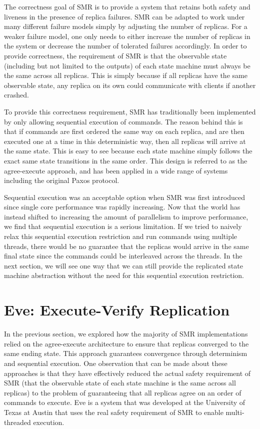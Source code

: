 \documentclass[11pt, oneside]{report}
\begin{document}
The correctness goal of SMR is to provide a system that retains both safety and liveness in the presence of replica failures. SMR can be adapted to work under many different failure models simply by adjusting the number of replicas. For a weaker failure model, one only needs to either increase the number of replicas in the system or decrease the number of tolerated failures accordingly. In order to provide correctness, the requirement of SMR is that the observable state (including but not limited to the outputs) of each state machine must always be the same across all replicas. This is simply because if all replicas have the same observable state, any replica on its own could communicate with clients if another crashed.

To provide this correctness requirement, SMR has traditionally been implemented by only allowing sequential execution of commands. The reason behind this is that if commands are first ordered the same way on each replica, and are then executed one at a time in this deterministic way, then all replicas will arrive at the same state. This is easy to see because each state machine simply follows the exact same state transitions in the same order. This design is referred to as the agree-execute approach, and has been applied in a wide range of systems including the original Paxos protocol.

Sequential execution was an acceptable option when SMR was first introduced since single core performance was rapidly increasing. Now that the world has instead shifted to increasing the amount of parallelism to improve performance, we find that sequential execution is a serious limitation. If we tried to naively relax this sequential execution restriction and run commands using multiple threads, there would be no guarantee that the replicas would arrive in the same final state since the commands could be interleaved across the threads. In the next section, we will see one way that we can still provide the replicated state machine abstraction without the need for this sequential execution restriction.  

\section{Eve: Execute-Verify Replication}

In the previous section, we explored how the majority of SMR implementations relied on the agree-execute architecture to ensure that replicas converged to the same ending state. This approach guarantees convergence through determinism and sequential execution. One observation that can be made about these approaches is that they have effectively reduced the actual safety requirement of SMR (that the observable state of each state machine is the same across all replicas) to the problem of guaranteeing that all replicas agree on an order of commands to execute. Eve is a system that was developed at the University of Texas at Austin that uses the real safety requirement of SMR to enable multi-threaded execution.
\end{document}
